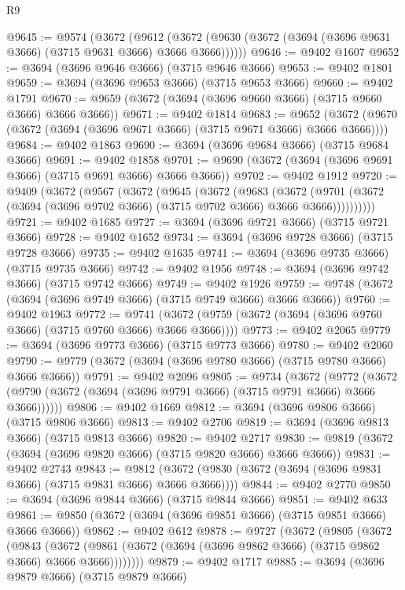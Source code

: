 \begin{lexlean}{R9}
\begin{coremodule}
@9645 := @9574
    (@3672
      (@9612 (@3672 (@9630 (@3672 (@3694 (@3696 @9631 @3666) (@3715 @9631 @3666) @3666 @3666))))))
@9646 := @9402 @1607
@9652 := @3694 (@3696 @9646 @3666) (@3715 @9646 @3666)
@9653 := @9402 @1801
@9659 := @3694 (@3696 @9653 @3666) (@3715 @9653 @3666)
@9660 := @9402 @1791
@9670 := @9659 (@3672 (@3694 (@3696 @9660 @3666) (@3715 @9660 @3666) @3666 @3666))
@9671 := @9402 @1814
@9683 := @9652 (@3672 (@9670 (@3672 (@3694 (@3696 @9671 @3666) (@3715 @9671 @3666) @3666 @3666))))
@9684 := @9402 @1863
@9690 := @3694 (@3696 @9684 @3666) (@3715 @9684 @3666)
@9691 := @9402 @1858
@9701 := @9690 (@3672 (@3694 (@3696 @9691 @3666) (@3715 @9691 @3666) @3666 @3666))
@9702 := @9402 @1912
@9720 := @9409
    (@3672
      (@9567
        (@3672
          (@9645
            (@3672
              (@9683
                (@3672
                  (@9701 (@3672 (@3694 (@3696 @9702 @3666) (@3715 @9702 @3666) @3666 @3666))))))))))
@9721 := @9402 @1685
@9727 := @3694 (@3696 @9721 @3666) (@3715 @9721 @3666)
@9728 := @9402 @1652
@9734 := @3694 (@3696 @9728 @3666) (@3715 @9728 @3666)
@9735 := @9402 @1635
@9741 := @3694 (@3696 @9735 @3666) (@3715 @9735 @3666)
@9742 := @9402 @1956
@9748 := @3694 (@3696 @9742 @3666) (@3715 @9742 @3666)
@9749 := @9402 @1926
@9759 := @9748 (@3672 (@3694 (@3696 @9749 @3666) (@3715 @9749 @3666) @3666 @3666))
@9760 := @9402 @1963
@9772 := @9741 (@3672 (@9759 (@3672 (@3694 (@3696 @9760 @3666) (@3715 @9760 @3666) @3666 @3666))))
@9773 := @9402 @2065
@9779 := @3694 (@3696 @9773 @3666) (@3715 @9773 @3666)
@9780 := @9402 @2060
@9790 := @9779 (@3672 (@3694 (@3696 @9780 @3666) (@3715 @9780 @3666) @3666 @3666))
@9791 := @9402 @2096
@9805 := @9734
    (@3672
      (@9772 (@3672 (@9790 (@3672 (@3694 (@3696 @9791 @3666) (@3715 @9791 @3666) @3666 @3666))))))
@9806 := @9402 @1669
@9812 := @3694 (@3696 @9806 @3666) (@3715 @9806 @3666)
@9813 := @9402 @2706
@9819 := @3694 (@3696 @9813 @3666) (@3715 @9813 @3666)
@9820 := @9402 @2717
@9830 := @9819 (@3672 (@3694 (@3696 @9820 @3666) (@3715 @9820 @3666) @3666 @3666))
@9831 := @9402 @2743
@9843 := @9812 (@3672 (@9830 (@3672 (@3694 (@3696 @9831 @3666) (@3715 @9831 @3666) @3666 @3666))))
@9844 := @9402 @2770
@9850 := @3694 (@3696 @9844 @3666) (@3715 @9844 @3666)
@9851 := @9402 @633
@9861 := @9850 (@3672 (@3694 (@3696 @9851 @3666) (@3715 @9851 @3666) @3666 @3666))
@9862 := @9402 @612
@9878 := @9727
    (@3672
      (@9805
        (@3672
          (@9843
            (@3672 (@9861 (@3672 (@3694 (@3696 @9862 @3666) (@3715 @9862 @3666) @3666 @3666))))))))
@9879 := @9402 @1717
@9885 := @3694 (@3696 @9879 @3666) (@3715 @9879 @3666)

\end{coremodule}
\end{lexlean}
